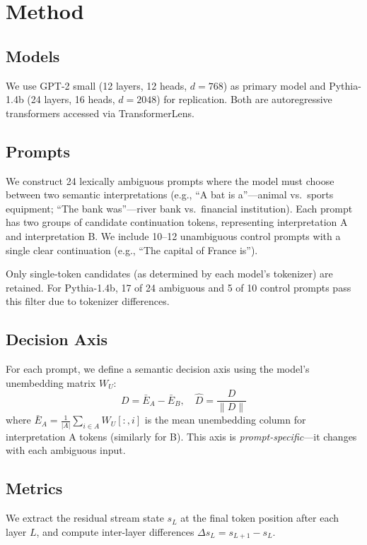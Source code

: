 \documentclass[11pt,a4paper]{article}
\begin{document}
\section{Method}
\label{sec:method}

\subsection{Models}
We use GPT-2 small (12 layers, 12 heads, $d = 768$) as primary model and Pythia-1.4b (24 layers, 16 heads, $d = 2048$) for replication. Both are autoregressive transformers accessed via TransformerLens.

\subsection{Prompts}
We construct 24 lexically ambiguous prompts where the model must choose between two semantic interpretations (e.g., ``A bat is a''---animal vs.\ sports equipment; ``The bank was''---river bank vs.\ financial institution). Each prompt has two groups of candidate continuation tokens, representing interpretation A and interpretation B. We include 10--12 unambiguous control prompts with a single clear continuation (e.g., ``The capital of France is'').

Only single-token candidates (as determined by each model's tokenizer) are retained. For Pythia-1.4b, 17 of 24 ambiguous and 5 of 10 control prompts pass this filter due to tokenizer differences.

\subsection{Decision Axis}
For each prompt, we define a semantic decision axis using the model's unembedding matrix $W_U$:
\begin{equation}
D = \bar{E}_A - \bar{E}_B, \quad \hat{D} = \frac{D}{\|D\|}
\end{equation}
where $\bar{E}_A = \frac{1}{|A|}\sum_{i \in A} W_U[:,i]$ is the mean unembedding column for interpretation A tokens (similarly for B). This axis is \emph{prompt-specific}---it changes with each ambiguous input.

\subsection{Metrics}
We extract the residual stream state $s_L$ at the final token position after each layer $L$, and compute inter-layer differences $\Delta s_L = s_{L+1} - s_L$.
\end{document}
